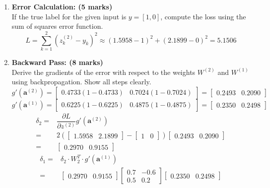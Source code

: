 \documentclass[12pt]{article}
\begin{document}
\begin{enumerate}[font=\Large]
	\item \textbf{Error Calculation: (5 marks)} \\
	      If the true label for the given input is $y=[1,0]$, compute the loss using the sum of squares error function.
	      $$
		      L = \sum_{k=1}^2 (z_k^{(2)} - y_k)^2 \approx (1.5958 - 1)^2+(2.1899 - 0)^2 = 5.1506
	      $$
	      \newpage
	\item \textbf{Backward Pass: (8 marks)}\\
	      Derive the gradients of the error with respect to the weights $W^{(2)}$ and $W^{(1)}$ using backpropagation. Show all steps clearly.
	      $$g'(\mathbf{a}^{(2)})=\begin{bmatrix} 0.4733(1-0.4733) & 0.7024(1-0.7024) \end{bmatrix}=\begin{bmatrix} 0.2493 & 0.2090 \end{bmatrix}$$
	      $$g'(\mathbf{a}^{(1)})=\begin{bmatrix} 0.6225(1-0.6225) &  0.4875(1- 0.4875) \end{bmatrix}=\begin{bmatrix} 0.2350 & 0.2498 \end{bmatrix}$$
	      $$
		      \begin{aligned}
			      \delta_2= & \dfrac{\partial L}{\partial z^{(2)}} g'(\mathbf{a}^{(2)})                                                                          \\
			      =         & 2(\begin{bmatrix} 1.5958 & 2.1899 \end{bmatrix}-\begin{bmatrix} 1 & 0 \end{bmatrix}) \begin{bmatrix} 0.2493 & 0.2090 \end{bmatrix} \\
			      =         & \begin{bmatrix} 0.2970 & 0.9155 \end{bmatrix}
		      \end{aligned}$$
	      $$
		      \begin{aligned}
			      \delta_1= & \delta_2\cdot W_2^T\cdot g'(\mathbf{a}^{(1)})                                                                                                \\
			      =         & \begin{bmatrix} 0.2970 & 0.9155 \end{bmatrix}\begin{bmatrix}0.7 & -0.6 \\0.5 & 0.2\end{bmatrix}\begin{bmatrix} 0.2350 & 0.2498 \end{bmatrix} \\

\end{aligned}$$
\end{enumerate}
\end{document}

